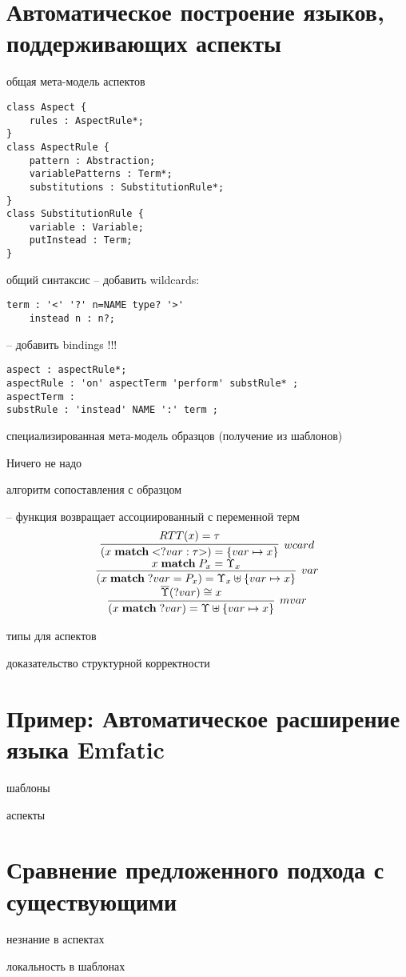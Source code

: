 \chapter{Автоматическое построение языков, поддерживающих аспекты}

общая мета-модель аспектов

\begin{lstlisting}
class Aspect {
	rules : AspectRule*;
}
class AspectRule {
	pattern : Abstraction;
	variablePatterns : Term*;
	substitutions : SubstitutionRule*;
}
class SubstitutionRule {
	variable : Variable;
	putInstead : Term;
}
\end{lstlisting}

общий синтаксис
 -- добавить wildcards:
\begin{lstlisting}
term : '<' '?' n=NAME type? '>'
	instead n : n?;
\end{lstlisting}

 -- добавить bindings !!! 
\begin{lstlisting}
aspect : aspectRule*;
aspectRule : 'on' aspectTerm 'perform' substRule* ;
aspectTerm : 
substRule : 'instead' NAME ':' term ;
\end{lstlisting}

специализированная мета-модель образцов (получение из шаблонов)

   Ничего не надо

алгоритм сопоставления с образцом

-- функция возвращает ассоциированный с переменной терм
$$
\begin{array}{c}
\infer[wcard]{
	(\match{x}{\wcard{?var}{\tau}}) = \meitem{var}{x}
}{RTT(x) = \tau}
\\
\infer[var]{
	(\match{x}{?var = P_x}) = \ME_x \mejoin \meitem{var}{x}
}{
\match{x}{P_x} = \ME_x
}
\\
\infer[mvar]{
	(\match{x}{?var}) = \ME \mejoin \meitem{var}{x}
}{
\meflatten{\ME}(?var) \cong x
}
\end{array}
$$

типы для аспектов
	

доказательство структурной корректности

\chapter{Пример: Автоматическое расширение языка Emfatic}

шаблоны

аспекты

\chapter{Сравнение предложенного подхода с существующими}

незнание в аспектах

локальность в шаблонах
